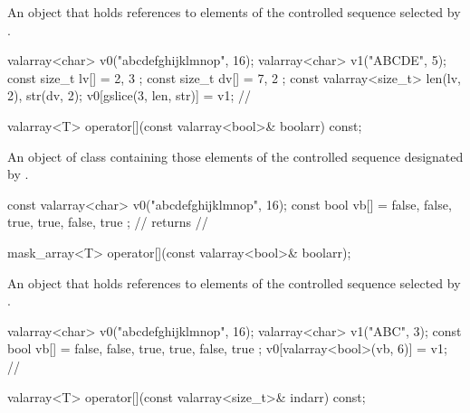 \begin{itemdescr}
\pnum
\returns An object that holds references to elements of the controlled
sequence selected by . \enterexample
\begin{codeblock}
valarray<char> v0("abcdefghijklmnop", 16);
valarray<char> v1("ABCDE", 5);
const size_t lv[] = { 2, 3 };
const size_t dv[] = { 7, 2 };
const valarray<size_t> len(lv, 2), str(dv, 2);
v0[gslice(3, len, str)] = v1;
// 
\end{codeblock}
\exitexample
\end{itemdescr}

%
\begin{itemdecl}
valarray<T> operator[](const valarray<bool>& boolarr) const;
\end{itemdecl}

\begin{itemdescr}
\pnum
\returns An object of class  containing those
elements of the controlled sequence designated by .
\enterexample
\begin{codeblock}
const valarray<char> v0("abcdefghijklmnop", 16);
const bool vb[] = { false, false, true, true, false, true };
//  returns
// 
\end{codeblock}
\exitexample
\end{itemdescr}

%
\begin{itemdecl}
mask_array<T> operator[](const valarray<bool>& boolarr);
\end{itemdecl}

\begin{itemdescr}
\pnum
\returns An object that holds references to elements of the controlled
sequence selected by . \enterexample
\begin{codeblock}
valarray<char> v0("abcdefghijklmnop", 16);
valarray<char> v1("ABC", 3);
const bool vb[] = { false, false, true, true, false, true };
v0[valarray<bool>(vb, 6)] = v1;
// 
\end{codeblock}
\exitexample
\end{itemdescr}

%
\begin{itemdecl}
valarray<T> operator[](const valarray<size_t>& indarr) const;
\end{itemdecl}

